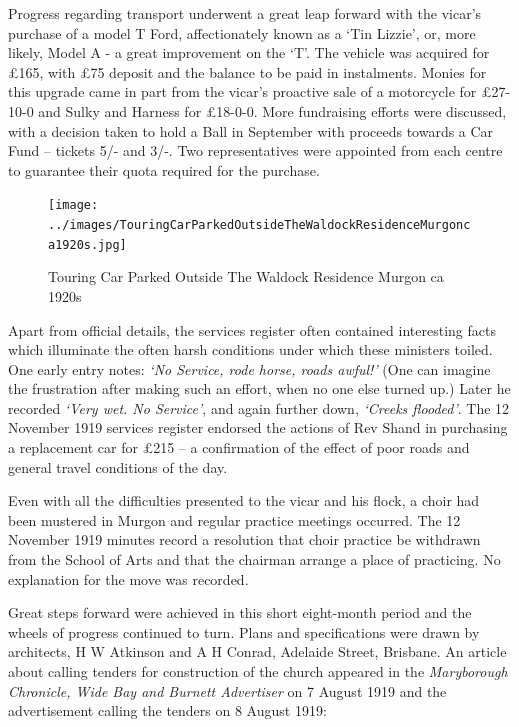 \smallskip


Progress regarding transport underwent a great leap forward with the vicar's purchase of a model T Ford, affectionately known as a `Tin Lizzie', or, more likely, Model A - a great improvement on the `T'. The vehicle was acquired for \pounds165, with \pounds75 deposit and the balance to be paid in instalments. Monies for this upgrade came in part from the vicar's proactive sale of a motorcycle for \pounds27-10-0 and Sulky and Harness for \pounds18-0-0. More fundraising efforts were discussed, with a decision taken to hold a Ball in September with proceeds towards a Car Fund -- tickets 5/- and 3/-. Two representatives were appointed from each centre to guarantee their quota required for the purchase.









\begin{figure}[!htb]
\begin{center}
\texttt{[image: ../images/TouringCarParkedOutsideTheWaldockResidenceMurgonca1920s.jpg]}
\caption{Touring Car Parked Outside The Waldock Residence Murgon ca 1920s}
\end{center}
\end{figure}




Apart from official details, the services register often contained interesting facts which illuminate the often harsh conditions under which these ministers toiled. One early entry notes: \emph{`No Service, rode horse, roads awful!'} (One can imagine the frustration after making such an effort, when no one else turned up.) Later he recorded \emph{`Very wet. No Service'}, and again further down, \emph{`Creeks flooded'}. The 12 November 1919 services register endorsed the actions of Rev Shand in purchasing a replacement car for \pounds215 -- a confirmation of the effect of poor roads and general travel conditions of the day.



Even with all the difficulties presented to the vicar and his flock, a choir had been mustered in Murgon and regular practice meetings occurred. The 12 November 1919 minutes record a resolution that choir practice be withdrawn from the School of Arts and that the chairman arrange a place of practicing. No explanation for the move was recorded.



Great steps forward were achieved in this short eight-month period and the wheels of progress continued to turn. Plans and specifications were drawn by architects, H W Atkinson and A H Conrad, Adelaide Street, Brisbane. An article about calling tenders for construction of the church appeared in the \emph{Maryborough Chronicle, Wide Bay and Burnett Advertiser} on 7 August 1919 and the advertisement calling the tenders on 8 August 1919:









